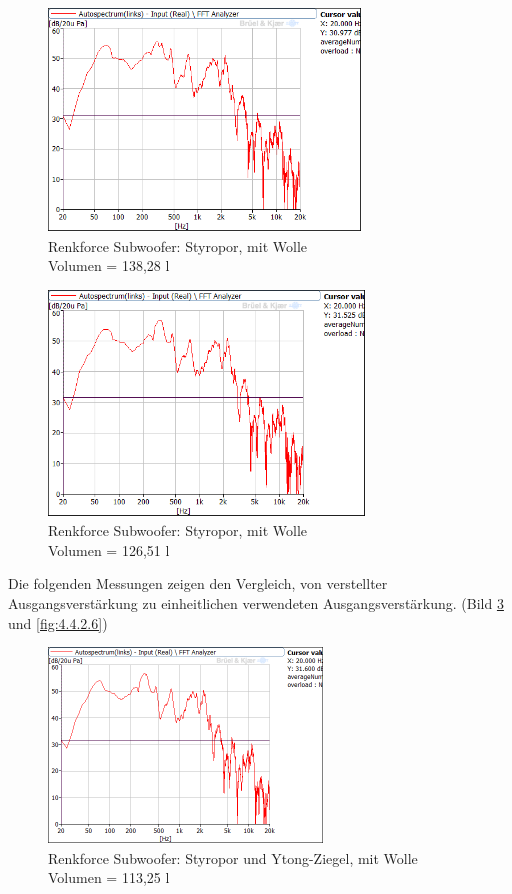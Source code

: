 \begin{figure} [H]
\centering
\includegraphics[width=0.74\textwidth]{img/Optimierung/Sub/RenkforceStyro_138l_Wolle.png}
\caption{Renkforce Subwoofer: Styropor, mit Wolle \\Volumen = 138,28 l}
\label{fig:4.4.2.3}
\end{figure}

\begin{figure} [H]
\centering
\includegraphics[width=0.75\textwidth]{img/Optimierung/Sub/RenkforceStyro_126l_Wolle.png}
\caption{Renkforce Subwoofer: Styropor, mit Wolle \\Volumen = 126,51 l}
\label{fig:4.4.2.4}
\end{figure}

\newpage
Die folgenden Messungen zeigen den Vergleich, von verstellter Ausgangsverstärkung zu einheitlichen verwendeten Ausgangsverstärkung. (Bild \ref{fig:4.4.2.5} und \ref{fig:4.4.2.6})
\begin{figure} [H]
\centering
\includegraphics[width=0.65\textwidth]{img/Optimierung/Sub/RenkforceStyro_113l_Wolle.png}
\caption{Renkforce Subwoofer: Styropor und Ytong-Ziegel, mit Wolle \\Volumen = 113,25 l}
\label{fig:4.4.2.5}
\end{figure}

